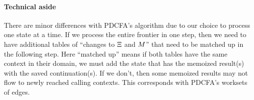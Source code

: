 \paragraph{Technical aside} There are minor differences with PDCFA's algorithm due to our choice to process one state at a time. If we process the entire frontier in one step, then we need to have additional tables of ``changes to $\Xi$ and $M$'' that need to be matched up in the following step. Here ``matched up'' means if both tables have the same context in their domain, we must add the state that has the memoized result(s) with the saved continuation(s). If we don't, then some memoized results may not flow to newly reached calling contexts. This corresponds with PDCFA's worksets of edges.

%
%
%
%

